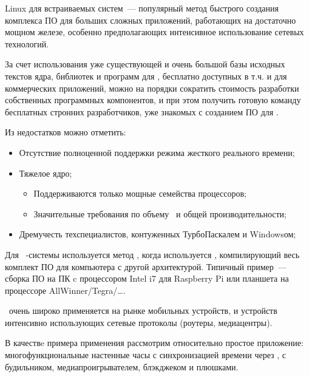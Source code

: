 Linux для встраиваемых систем\ ---
популярный метод быстрого создания комплекса ПО для больших сложных приложений,
работающих на достаточно мощном железе, особенно предполагающих интенсивное
использование сетевых технологий.

За счет использования уже существующей и очень большой базы исходных текстов
ядра, библиотек и программ для \linux, бесплатно доступных в т.ч. и для
коммерческих приложений, можно на порядки сократить стоимость разработки
собственных программных компонентов, и при этом получить готовую команду
бесплатных стронних разработчиков, уже знакомых с созданием ПО для \linux.

Из недостатков можно отметить:
\begin{itemize}
  \item Отсутствие полноценной поддержки режима жесткого реального времени;
  \item Тяжелое ядро;
  \begin{itemize}
  \item Поддерживаются только мощные семейства процессоров;
  \item Значительные требования по объему \ram\ и общей производительности;
  \end{itemize}
  \item Дремучесть техспециалистов, контуженных ТурбоПаскалем и
Win\-dows\-ом;
\end{itemize}

Для \ \emlinux-системы используется метод ,
когда используется , компилирующий весь комплект ПО для
компьютера с другой архитектурой. Типичный пример\ --- сборка ПО на
ПК c процессором Intel i7 для Raspberry Pi или планшета на процессоре
AllWinner/Tegra/\ldots.

\emlinux\ очень широко применяется на рынке мобильных устройств, и устройств интенсивно использующих сетевые протоколы
(роутеры, медиацентры).

В качествe примера применения рассмотрим относительно простое приложение:
многофункциональные настенные часы с синхронизацией времени через \internet, с
будильником, медиапроигрывателем, блэкджеком и плюшками.
